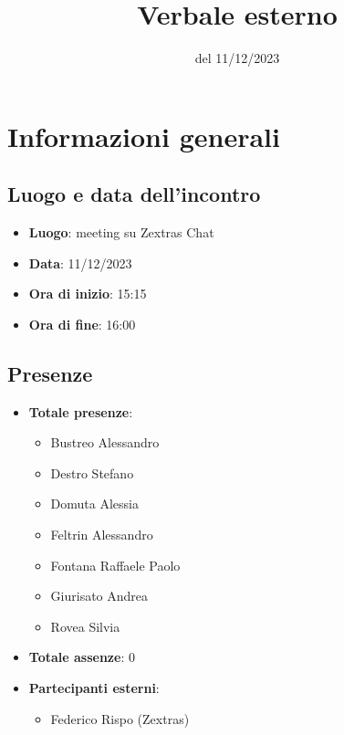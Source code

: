\documentclass[12pt]{article}
\title{Verbale esterno}
\date{del 11/12/2023}
\begin{document}
	\makefirstpage
	
	
	\clearpage
	
	\tableofcontents
	\clearpage

    \section{Informazioni generali}
    
    \subsection{Luogo e data dell'incontro}
    
    \begin{itemize}
    	\item \textbf{Luogo}: meeting su Zextras Chat
    	\item \textbf{Data}: 11/12/2023
    	\item \textbf{Ora di inizio}: 15:15
    	\item \textbf{Ora di fine}: 16:00
    \end{itemize}
    
    \subsection{Presenze}
    
    \begin{itemize}
    	\item \textbf{Totale presenze}:
    	\begin{itemize}
    		\item Bustreo Alessandro
    		\item Destro Stefano
    		\item Domuta Alessia 
    		\item Feltrin Alessandro 
    		\item Fontana Raffaele Paolo 
    		\item Giurisato Andrea 
    		\item Rovea Silvia
    	\end{itemize}
    	
    	\item \textbf{Totale assenze}: 0
    	
    	\item \textbf{Partecipanti esterni}:
    	\begin{itemize}
    		\item Federico Rispo (Zextras)
    	\end{itemize}
    \end{itemize}
    
\end{document}
